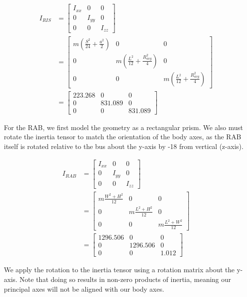 \begin{align*}
I_{RIS} &=
\begin{bmatrix}
I_{xx} & 0 & 0 \\
0 & I_{yy} & 0 \\
0 & 0 & I_{zz}
\end{bmatrix} \\
&=
\begin{bmatrix}
m \left(\frac{S^{2}}{24} + \frac{a^{2}}{2}\right) & 0 & 0 \\
0 & m \left(\frac{L^{2}}{12} + \frac{R_{avg}^{2}}{4}\right) & 0 \\
0 & 0 & m \left(\frac{L^{2}}{12} + \frac{R_{avg}^{2}}{4}\right) 
\end{bmatrix} \\
&=
\begin{bmatrix}
223.268 & 0 & 0 \\
0 & 831.089 & 0 \\
0 & 0 & 831.089 
\end{bmatrix}
\end{align*}

For the RAB, we first model the geometry as a rectangular prism. We also must rotate the inertia tensor to match the orientation of the body axes, as the RAB itself is rotated relative to the bus about the y-axis by -18\degree{} from vertical (z-axis).

\begin{align*}
I_{RAB} &=
\begin{bmatrix}
I_{xx} & 0 & 0 \\
0 & I_{yy} & 0 \\
0 & 0 & I_{zz}
\end{bmatrix} \\
&=
\begin{bmatrix}
m \frac{W^{2} + H^{2}}{12} & 0 & 0 \\
0 & m \frac{L^{2} + H^{2}}{12} & 0 \\
0 & 0 & m \frac{L^{2} + W^{2}}{12} 
\end{bmatrix} \\
&=
\begin{bmatrix}
1296.506 & 0 & 0 \\
0 & 1296.506 & 0 \\
0 & 0 & 1.012 
\end{bmatrix}
\end{align*}

We apply the rotation to the inertia tensor using a rotation matrix about the y-axis. Note that doing so results in non-zero products of inertia, meaning our principal axes will not be aligned with our body axes.

